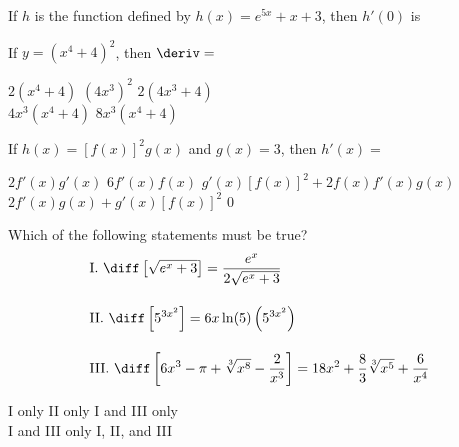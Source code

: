 \begin{questions}
    \question If $h$ is the function defined by $h(x) = e^{5x} + x + 3$, then $h'(0) $ is \\

    \begin{oneparchoices}
    \end{oneparchoices} \par \horizontalline

    \question If $y = \left(x^4 + 4\right)^2$, then $\deriv = $ \\

    \begin{oneparchoices}
        \choice $2\left(x^4 + 4\right)$
        \choice $\left(4x^3\right)^2$
        \choice $2\left(4x^3 + 4\right)$ \\[11pt]
        \makebox[0.23 \textwidth] \choice $4x^3\left(x^4 + 4\right)$
        \makebox[0.25 \textwidth] \choice $8x^3\left(x^4 + 4\right)$
    \end{oneparchoices} \par \horizontalline

    \question If $h(x) = \left[f(x)\right]^2 g(x)$ and $g(x) = 3$, then $h'(x) = $ \\

    \begin{oneparchoices}
        \choice $2f'(x)g'(x)$
        \choice $6f'(x)f(x)$
        \choice $g'(x)\left[f(x)\right]^2 + 2f(x)f'(x)g(x)$ \\[11pt]
        \makebox[0.23 \textwidth] \choice $2f'(x)g(x) + g'(x)\left[f(x)\right]^2$
        \makebox[0.25 \textwidth] \choice $0$
    \end{oneparchoices} \par \horizontalline

    \question Which of the following statements must be true?
    \begin{align*}
        & \text{I. } \diff \left[\sqrt{e^x + 3}\right] = \dfrac{e^x}{2\sqrt{e^x + 3}} \\[11pt]
        & \text{II. } \diff \left[5^{3x^2}\right] = 6x\ln (5)\left(5^{3x^2}\right) \\[11pt]
        & \text{III. } \diff \left[6x^3 - \pi + \sqrt[3]{x^8} - \dfrac{2}{x^3}\right] = 18x^2 + \dfrac{8}{3}\sqrt[3]{x^5} + \dfrac{6}{x^4}
    \end{align*}

    \begin{oneparchoices}
        \choice I only 
        \choice II only 
        \choice I and III only \\[11pt]
        \makebox[0.2 \textwidth] \choice I and III only 
        \makebox[0.25 \textwidth] \choice I, II, and III
    \end{oneparchoices} \par \horizontalline
\end{questions}